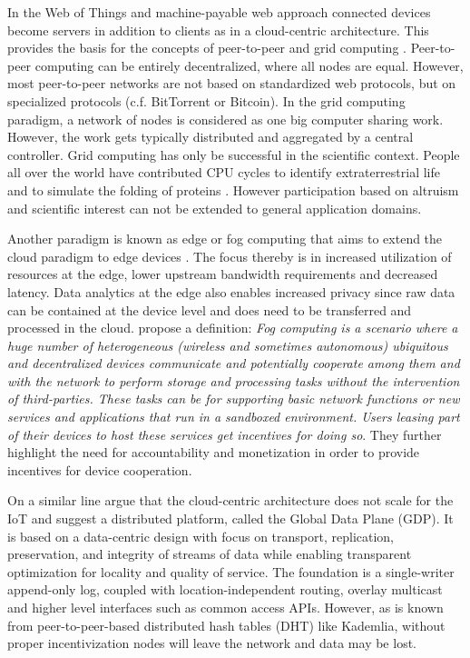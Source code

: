 In the Web of Things and machine-payable web approach connected devices become servers in addition to clients as in a cloud-centric architecture. This provides the basis for the concepts of peer-to-peer \parencite{Rodrigues:2010:PS:1831407.1831427}and grid computing \parencite{Anderson2004boinc}. Peer-to-peer computing can be entirely decentralized, where all nodes are equal. However, most peer-to-peer networks are not based on standardized web protocols, but on specialized protocols (c.f. BitTorrent or Bitcoin). In the grid computing paradigm, a network of nodes is considered as one big computer sharing work. However, the work gets typically distributed and aggregated by a central controller. Grid computing has only be successful in the scientific context. People all over the world have contributed CPU cycles to identify extraterrestrial life \parencite{Anderson:2002:SEP:581571.581573} and to simulate the folding of proteins \parencite{Beberg2009Folding}. However participation based on altruism and scientific interest can not be extended to general application domains.   

Another paradigm is known as edge or fog computing that aims to extend the cloud paradigm to edge devices \parencite{Bonomi:2012:FCR:2342509.2342513,ISI:000343986300007,Yi:2015:SFC:2757384.2757397}. The focus thereby is in increased utilization of resources at the edge, lower upstream bandwidth requirements and decreased latency. Data analytics at the edge also enables increased privacy since raw data can be contained at the device level and does need to be transferred and processed in the cloud. \cite{ISI:000343986300007} propose a definition: \emph{Fog computing is a scenario where a huge number of heterogeneous (wireless and sometimes autonomous) ubiquitous and decentralized devices communicate and potentially cooperate among them and with the network to perform storage and processing tasks without the intervention of third-parties. These tasks can be for supporting basic network functions or new services and applications that run in a sandboxed environment. Users leasing part of their devices to host these services get incentives for doing so}. They further highlight the need for accountability and monetization in order to provide incentives for device cooperation. 

On a similar line \cite{Zhang:2015} argue that the cloud-centric architecture does not scale for the IoT and suggest a distributed platform, called the Global Data Plane (GDP). It is based on a data-centric design with focus on transport, replication, preservation, and integrity of streams of data while enabling transparent optimization for locality and quality of service. The foundation is a single-writer append-only log, coupled with location-independent routing, overlay multicast and higher level interfaces such as common access APIs. However, as is known from peer-to-peer-based distributed hash tables (DHT) like Kademlia, without proper incentivization nodes will leave the network and data may be lost. 


